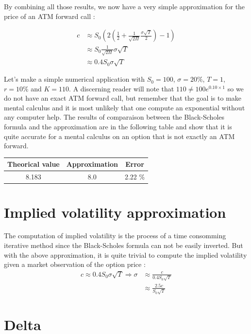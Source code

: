 \documentclass[hidelinks]{article}
\newenvironment{nalign}{
    \begin{equation}
    \begin{aligned}
}{
    \end{aligned}
    \end{equation}
    \ignorespacesafterend
}
\begin{document}
	By combining all those results, we now have a very simple approximation for the price of an ATM forward call :
	
	\begin{nalign}
	c &\approx S_0 \left(2\left(\frac{1}{2}+\frac{1}{\sqrt{2\Pi}} \frac{\sigma \sqrt{T}}{2} \right) -1 \right) \\
	& \approx S_0\frac{1}{\sqrt{2\Pi}}\sigma \sqrt{T} \\
	& \approx 0.4 S_0 \sigma \sqrt{T}
	\end{nalign}
	
	Let's make a simple numerical application with $S_0=100$, $\sigma=20\%$, $T=1$, $r=10\%$ and $K=110$. A discerning reader will note that $110  \ne 100e^{0.10 \times 1}$ so we do not have an exact ATM forward call, but remember that the goal is to make mental calculus and it is most unlikely that one compute an exponential without any computer help. The results of comparaison between the Black-Scholes formula and the approximation are in the following table and show that it is quite accurate for a mental calculus on an option that is not exactly an ATM forward.
	\newline
	
	\begin{center}
	\begin{tabular}{|c|c|c|}
	
\hline
Theorical value & Approximation & Error \\
\hline
8.183 & 8.0 & 2.22 \% \\
\hline
\end{tabular}
\end{center}
\newpage
\section{	Implied volatility approximation}

The computation of implied volatility is the process of a time consomming iterative method since the Black-Scholes formula can not be easily inverted. But with the above approximation, it is quite trivial to compute the implied volatility given a market observation of the option price :
\begin{nalign}
	c \approx 0.4 S_0 \sigma \sqrt{T} \Rightarrow \sigma & \approx \frac{c}{0.4 S_0 \sqrt{T}} \\ 
													& \approx \frac{2.5 c}{S_0 \sqrt{T}} 
\end{nalign}

\section{Delta}
\end{document}
